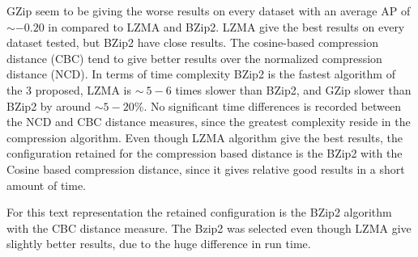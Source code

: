 GZip seem to be giving the worse results on every dataset with an average AP of $\sim -0.20$ in compared to LZMA and BZip2.
LZMA give the best results on every dataset tested, but BZip2 have close results.
The cosine-based compression distance (CBC) tend to give better results over the normalized compression distance (NCD).
In terms of time complexity BZip2 is the fastest algorithm of the 3 proposed, LZMA is $\sim ~5-6$ times slower than BZip2, and GZip slower than BZip2 by around $\sim 5-20$\%.
No significant time differences is recorded between the NCD and CBC distance measures, since the greatest complexity reside in the compression algorithm.
Even though LZMA algorithm give the best results, the configuration retained for the compression based distance is the BZip2 with the Cosine based compression distance, since it gives relative good results in a short amount of time.

For this text representation the retained configuration is the BZip2 algorithm with the CBC distance measure.
The Bzip2 was selected even though LZMA give slightly better results, due to the huge difference in run time.

